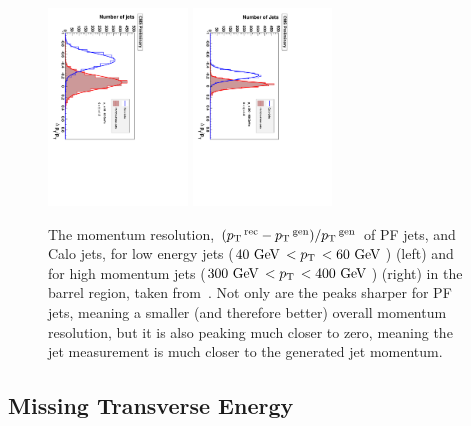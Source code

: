 \begin{figure}[htbp]
  \begin{center}
  \includegraphics[width=0.33\textwidth, angle =90]{Figures/detector/MomResPFjetCaloJet_lowPt.pdf}
  \includegraphics[width=0.33\textwidth, angle =90]{Figures/detector/MomResPFjetCaloJet_highPt.pdf}
  \caption{The momentum resolution, $(p_{\text{T}}\,^{\mathrm{rec}} - p_{\text{T}}\,^{\mathrm{gen}})/p_{\text{T}}\,^{\mathrm{gen}}$ of \ac{PF} jets, and Calo jets, for low energy jets ($40~\mathrm{GeV}\,<p_{\text{T}}\,<60~\mathrm{GeV}\,$) (left) and for high momentum jets ($300~\mathrm{GeV}\,<p_{\text{T}}\,<400~\mathrm{GeV}\,$) (right) in the barrel region, taken from~\cite{PFT-09-001}. Not only are the peaks sharper for \ac{PF} jets, meaning a smaller (and therefore better) overall momentum resolution, but it is also peaking much closer to zero, meaning the jet measurement is much closer to the generated jet momentum.}
  \label{fig:PFmomRes}
  \end{center}
\end{figure}


\subsection{Missing Transverse Energy}

